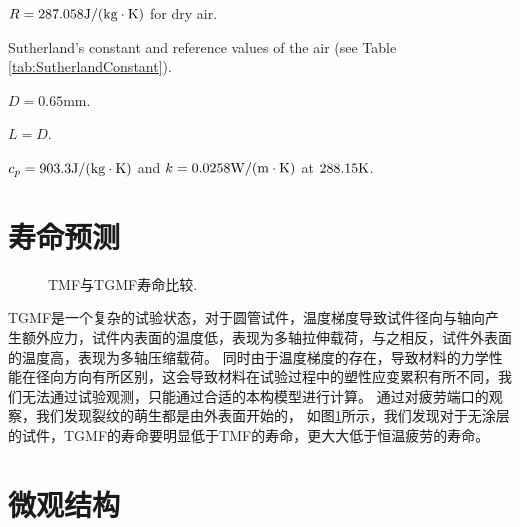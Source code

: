 \documentclass{article}
\begin{document}
\begin{table}[htbp]
\begin{threeparttable}
\begin{tabular}{llrrrr}
    \bottomrule
    \end{tabular}%
    \begin{tablenotes}
    \item[*1] $R = 287.058 {\rm{J/(kg}} \cdot {\rm{K}})$ for dry air.
    \item[*2] Sutherland's constant and reference values of the air (see Table \ref{tab:SutherlandConstant}).
    \item[*3] $D=0.65$mm.
    \item[*4] $L=D$.
    \item[*5] $c_{p}=903.3 {\rm{J/(kg}} \cdot {\rm{K}})$ and $k=0.0258 {\rm{W/(m}} \cdot {\rm{K}})$ at $288.15{\rm{K}}$.
    \end{tablenotes}
    \end{threeparttable}
  \label{tab:addlabel}%
\end{table}%

\section{寿命预测}
\begin{figure}[!htp]
\caption{TMF与TGMF寿命比较.}
\label{Fig:plot_exp_fatigue_life}
\end{figure}

TGMF是一个复杂的试验状态，对于圆管试件，温度梯度导致试件径向与轴向产生额外应力，试件内表面的温度低，表现为多轴拉伸载荷，与之相反，试件外表面的温度高，表现为多轴压缩载荷。
同时由于温度梯度的存在，导致材料的力学性能在径向方向有所区别，这会导致材料在试验过程中的塑性应变累积有所不同，我们无法通过试验观测，只能通过合适的本构模型进行计算。
通过对疲劳端口的观察，我们发现裂纹的萌生都是由外表面开始的，
如图\ref{Fig:plot_exp_fatigue_life}所示，我们发现对于无涂层的试件，TGMF的寿命要明显低于TMF的寿命，更大大低于恒温疲劳的寿命。

\section{微观结构}

\end{document}
